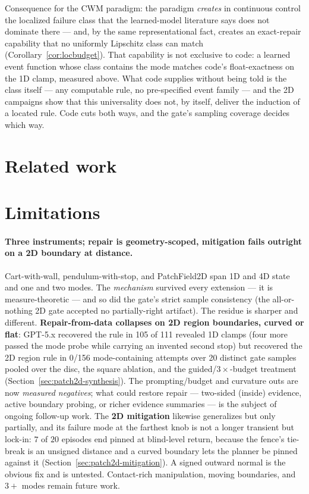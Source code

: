 \documentclass[11pt]{article}
\theoremstyle{definition}
\theoremstyle{remark}
\begin{document}
Consequence for the CWM paradigm: the paradigm \emph{creates} in continuous control the localized failure class that the learned-model literature says does not dominate there --- and, by the same representational fact, creates an exact-repair capability that no uniformly Lipschitz class can match (Corollary~\ref{cor:locbudget}). That capability is not exclusive to code: a learned event function whose class contains the mode matches code's float-exactness on the 1D clamp, measured above. What code supplies without being told is the class itself --- any computable rule, no pre-specified event family --- and the 2D campaigns show that this universality does not, by itself, deliver the induction of a located rule. Code cuts both ways, and the gate's sampling coverage decides which way.

\section{Related work}
\label{sec:related}



\section{Limitations}
\label{sec:limitations}

\paragraph{Three instruments; repair is geometry-scoped, mitigation fails outright on a 2D boundary at distance.} Cart-with-wall, pendulum-with-stop, and PatchField2D span 1D and 4D state and one and two modes. The \emph{mechanism} survived every extension --- it is measure-theoretic --- and so did the gate's strict sample consistency (the all-or-nothing 2D gate accepted no partially-right artifact). The residue is sharper and different. \textbf{Repair-from-data collapses on 2D region boundaries, curved or flat}: GPT-5.x recovered the rule in 105 of 111 revealed 1D clamps (four more passed the mode probe while carrying an invented second stop) but recovered the 2D region rule in 0/156 mode-containing attempts over 20 distinct gate samples pooled over the disc, the square ablation, and the guided/$3\times$-budget treatment (Section~\ref{sec:patch2d-synthesis}). The prompting/budget and curvature outs are now \emph{measured negatives}; what could restore repair --- two-sided (inside) evidence, active boundary probing, or richer evidence summaries --- is the subject of ongoing follow-up work. The \textbf{2D mitigation} likewise generalizes but only partially, and its failure mode at the farthest knob is not a longer transient but lock-in: $7$ of $20$ episodes end pinned at blind-level return, because the fence's tie-break is an unsigned distance and a curved boundary lets the planner be pinned against it (Section~\ref{sec:patch2d-mitigation}). A signed outward normal is the obvious fix and is untested. Contact-rich manipulation, moving boundaries, and $3{+}$ modes remain future work.
\end{document}
